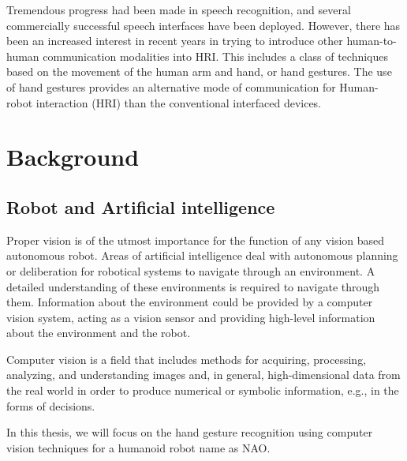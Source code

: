 Tremendous progress had been made in speech recognition, and several commercially successful speech interfaces have been deployed. However, there has been an increased interest in recent years in trying to introduce other human-to-human communication modalities into HRI. This includes a class of techniques based on the movement of the human arm and hand, or hand gestures. The use of hand gestures provides an alternative mode of communication for Human-robot interaction (HRI) than the conventional interfaced devices.

\chapter{Background} 
\section{Robot and Artificial intelligence} Proper vision is of the utmost importance for the function of any vision based autonomous robot. Areas of artificial intelligence deal with autonomous planning or deliberation for robotical systems to navigate through an environment. A detailed understanding of these environments is required to navigate through them. Information about the environment could be provided by a computer vision system, acting as a vision sensor and providing high-level information about the environment and the robot.

Computer vision is a field that includes methods for acquiring, processing, analyzing, and understanding images and, in general, high-dimensional data from the real world in order to produce numerical or symbolic information, e.g., in the forms of decisions.

In this thesis, we will focus on the hand gesture recognition using computer vision techniques for a humanoid robot name as NAO.

